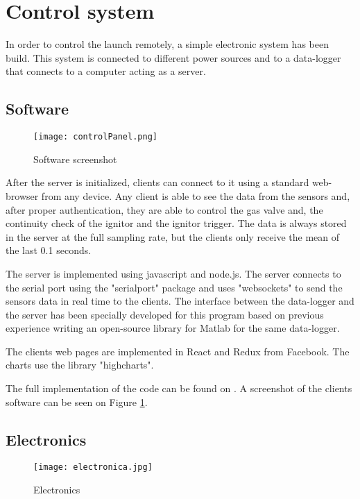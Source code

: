 
\section*{Control system}

In order to control the launch remotely, a simple electronic system has been build. This system is connected to different power sources and to a data-logger that connects to a computer acting as a server.

\subsection*{Software}

\begin{figure}[H]
  \centering
  \texttt{[image: controlPanel.png]}
  \caption{Software screenshot}
  \label{fig:softwareScreenshot}
\end{figure}

After the server is initialized, clients can connect to it using a standard web-browser from any device. Any client is able to see the data from the sensors and, after proper authentication, they are able to control the gas valve and, the continuity check of the ignitor and the ignitor trigger. The data is always stored in the server at the full sampling rate, but the clients only receive the mean of the last 0.1 seconds.

The server is implemented using javascript and node.js. The server connects to the serial port using the "serialport" package and uses "websockets" to send the sensors data in real time to the clients. The interface between the data-logger and the server has been specially developed for this program based on previous experience writing an open-source library for Matlab for the same data-logger.

The clients web pages are implemented in React and Redux from Facebook. The charts use the library "highcharts".

The full implementation of the code can be found on \cite{hybridControlPanelGithub}. A screenshot of the clients software can be seen on Figure \ref{fig:softwareScreenshot}.

\subsection*{Electronics}

\begin{figure}[H]
  \centering
  \texttt{[image: electronica.jpg]}
  \caption{Electronics}
  \label{fig:electronica}
\end{figure}

